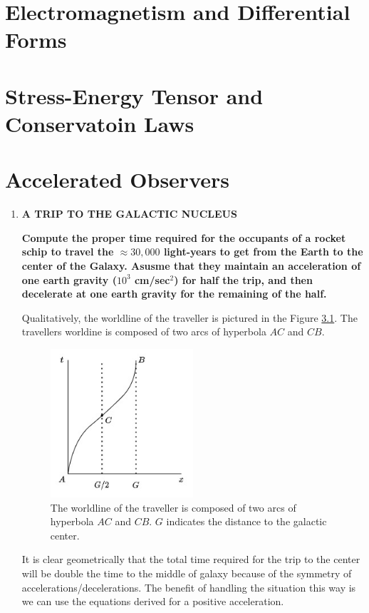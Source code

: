 \documentclass[9pt]{report}
\begin{document}
\chapter{Electromagnetism and Differential Forms}
\chapter{Stress-Energy Tensor and Conservatoin Laws}
\chapter{Accelerated Observers}
\begin{enumerate}
\item \textbf{A TRIP TO THE GALACTIC NUCLEUS}

\textbf{Compute the proper time required
for the occupants of a rocket schip to travel the $\approx 30,000$ light-years
to get from the Earth to the center of the Galaxy. Asusme that they maintain
an acceleration of one earth gravity ($10^3$ cm/sec$^2$) for half the trip,
and then decelerate at one earth gravity for the remaining of the half.}

Qualitatively, the worldline of the traveller is pictured in the Figure \ref{galactic_center}.
The travellers worldine is composed of two arcs of hyperbola $AC$ and $CB$.
\begin{figure}
  \begin{center}
  \includegraphics[width=0.50\textwidth]{images/galactic_center_minkowski.jpg}
  \end{center}
  \caption{The worldline of the traveller is composed of two arcs of hyperbola
  $AC$ and $CB$. $G$ indicates the distance to the galactic center.}
  \label{galactic_center}
\end{figure}
It is clear geometrically that the total time required for the trip to the
center will be double the time to the middle of galaxy because of the symmetry
of accelerations/decelerations. The benefit of handling the situation this
way is we can use the equations derived for a positive acceleration.



\end{enumerate}
\end{document}
